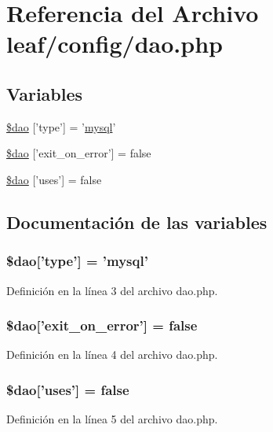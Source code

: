 \hypertarget{dao_8php}{\section{Referencia del Archivo leaf/config/dao.php}
\label{dao_8php}
}
\subsection*{Variables}
\begin{DoxyCompactItemize}
\item 
\hyperlink{dao_8php_a4bf93d904256497535bcd4c671a1818c}{\$dao} \mbox{[}'type'\mbox{]} = '\hyperlink{classmysql}{mysql}'
\item 
\hyperlink{dao_8php_aaff6822059d5478ae7719829bd4f3cac}{\$dao} \mbox{[}'exit\-\_\-on\-\_\-error'\mbox{]} = false
\item 
\hyperlink{dao_8php_a1df85c1e880d4033408de3adc3a565da}{\$dao} \mbox{[}'uses'\mbox{]} = false
\end{DoxyCompactItemize}


\subsection{Documentación de las variables}
\hypertarget{dao_8php_a4bf93d904256497535bcd4c671a1818c}{
\subsubsection[{\$dao}]{\setlength{\rightskip}{0pt plus 5cm}\${\bf dao}\mbox{[}'type'\mbox{]} = '{\bf mysql}'}}\label{dao_8php_a4bf93d904256497535bcd4c671a1818c}


Definición en la línea 3 del archivo dao.\-php.

\hypertarget{dao_8php_aaff6822059d5478ae7719829bd4f3cac}{
\subsubsection[{\$dao}]{\setlength{\rightskip}{0pt plus 5cm}\${\bf dao}\mbox{[}'exit\-\_\-on\-\_\-error'\mbox{]} = false}}\label{dao_8php_aaff6822059d5478ae7719829bd4f3cac}


Definición en la línea 4 del archivo dao.\-php.

\hypertarget{dao_8php_a1df85c1e880d4033408de3adc3a565da}{
\subsubsection[{\$dao}]{\setlength{\rightskip}{0pt plus 5cm}\${\bf dao}\mbox{[}'uses'\mbox{]} = false}}\label{dao_8php_a1df85c1e880d4033408de3adc3a565da}


Definición en la línea 5 del archivo dao.\-php.

